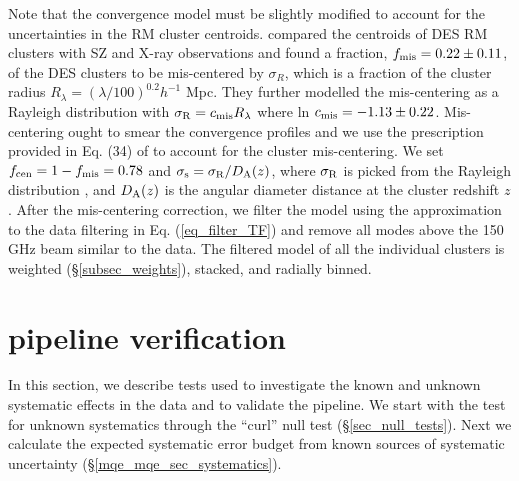 Note that the convergence model must be slightly modified to account for the uncertainties in the RM cluster centroids.
\citet{rykoff16} compared the centroids of DES RM clusters with SZ \citep{bleem15} and X-ray observations and found a fraction, $f_{\rm mis} = 0.22 \pm 0.11$, of the DES clusters to be mis-centered by $\sigma_{R}$, which is a fraction of the cluster radius $R_{\lambda} = (\lambda/100)^{0.2} h^{-1}$ Mpc. They further modelled the mis-centering as a Rayleigh distribution with $\sigma_{\rm R}  = c_{\rm mis} R_{\lambda}$ where ln $c_{\rm mis} = -1.13 \pm 0.22$.
Mis-centering ought to smear the convergence profiles and we use the prescription provided in Eq. (34) of \citet{oguri10} to account for the cluster mis-centering. We set \mbox{$f_{\rm cen} = 1- f_{\rm mis} =  0.78$} and $\sigma_{\rm s} = \sigma_{\rm R}/D_{\rm A}(z)$, where $\sigma_{\rm R}$ is picked from the Rayleigh distribution \citep{rykoff16}, and $D_{\rm A}(z)$ is the angular diameter distance at the cluster redshift $z$.
After the mis-centering correction, we filter the model using the approximation to the data filtering in Eq. (\ref{eq_filter_TF}) and remove all modes above the \sptpol{} 150 GHz beam similar to the data. %
The filtered model of all the individual clusters is weighted (\S\ref{subsec_weights}), stacked, and radially binned. 


\section{pipeline verification}
\label{sec:pipeline_verfication}
In this section, we describe tests used to investigate the known and unknown systematic effects in the data and to validate the pipeline.
We start with the test for unknown systematics through the ``curl'' null test (\S\ref{sec_null_tests}).
Next we calculate the expected systematic error budget from known sources of systematic uncertainty (\S\ref{mqe_mqe_sec_systematics}). 


